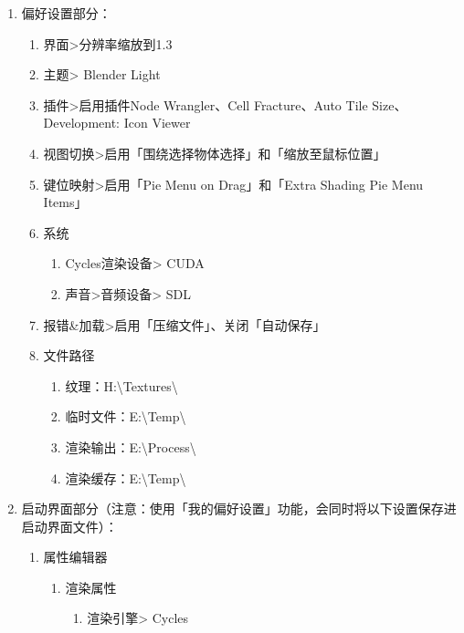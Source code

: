 \documentclass{../../PublicResources/DocClass}
\begin{document}
    \newpage
    \par
    \begin{enumerate}
        \item 偏好设置部分：
        \begin{enumerate}
            \item 界面>分辨率缩放到1.3
            \item 主题> Blender Light
            \item 插件>启用插件Node Wrangler、Cell Fracture、Auto Tile Size、Development: Icon Viewer
            \item 视图切换>启用「围绕选择物体选择」和「缩放至鼠标位置」
            \item 键位映射>启用「Pie Menu on Drag」和「Extra Shading Pie Menu Items」
            \item 系统
            \begin{enumerate}
                \item Cycles渲染设备> CUDA
                \item 声音>音频设备> SDL
            \end{enumerate}
            \item 报错\&加载>启用「压缩文件」、关闭「自动保存」
            \item 文件路径
            \begin{enumerate}
                \item 纹理：H:\textbackslash Textures\textbackslash
                \item 临时文件：E:\textbackslash Temp\textbackslash
                \item 渲染输出：E:\textbackslash Process\textbackslash
                \item 渲染缓存：E:\textbackslash Temp\textbackslash
            \end{enumerate}
        \end{enumerate}
        \item 启动界面部分（注意：使用「我的偏好设置」功能，会同时将以下设置保存进启动界面文件）：
        \begin{enumerate}
            \item 属性编辑器
            \begin{enumerate}
                \item 渲染属性
                \begin{enumerate}
                    \item 渲染引擎> Cycles

\end{enumerate}
\end{enumerate}
\end{enumerate}
\end{enumerate}
\end{document}
